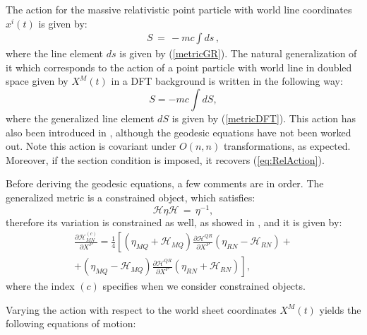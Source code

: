 \documentclass[prd, aps, superscriptaddress, preprintnumbers, twocolumn, floatfix, nofootinbib]{revtex4}
\begin{document}
The action for the massive relativistic point particle
with world line coordinates $x^i(t)$ is given by:
\begin{eqnarray}
S \, = \,-mc \int ds \, \label{eq:RelAction} ,
\end{eqnarray}
where the line element $ds$ is given by (\ref{metricGR}).
The natural generalization of it which corresponds to the action of a point particle with world line in doubled space given by $X^M(t)$ in a DFT background
is written in the following way:
\begin{equation} \label{action}
    S = -mc \int dS ,
\end{equation}
where the generalized line element $dS$ is given by (\ref{metricDFT}). This action has also been introduced in \cite{Ko:2016dxa}, although the geodesic equations have not been worked out. Note this action is covariant under $O(n,n)$ transformations, as expected. Moreover, if the section condition is imposed, it recovers (\ref{eq:RelAction}).

Before deriving the geodesic equations, a few comments are in order. The generalized metric is a constrained object, which satisfies:
\begin{equation}
\mathcal{H}\eta\mathcal{H} \, = \, \eta^{-1},
\end{equation}
therefore its variation is constrained as well, as showed in \cite{zwiehohmhull1}, and it is given by:
\begin{align}
\frac{\partial\mathcal{H}_{MN}^{(c)}}{\partial X^{P}}=\frac{1}{4}\left[\left(\eta_{MQ}+\mathcal{H}_{MQ}\right)\frac{\partial\mathcal{H}^{QR}}{\partial X^{P}}\left(\eta_{RN}-\mathcal{H}_{RN}\right)+\right. \nonumber\\
\left.+\left(\eta_{MQ}-\mathcal{H}_{MQ}\right)\frac{\partial\mathcal{H}^{QR}}{\partial X^{P}}\left(\eta_{RN}+\mathcal{H}_{RN}\right)\right],
\end{align}
where the index $(c)$ specifies when we consider constrained objects.

Varying the action with respect to the world sheet coordinates
$X^M(t)$ yields the following equations of motion:
\end{document}
